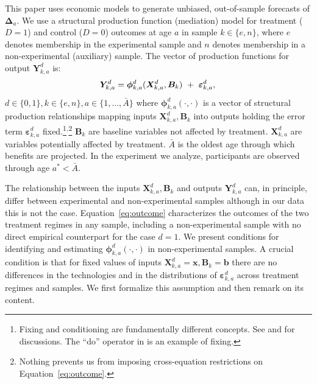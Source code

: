 \noindent This paper uses economic models to generate unbiased, out-of-sample forecasts of $\bm{\Delta}_a$. We use a structural production function (mediation) model for treatment ($D=1$) and control ($D=0$) outcomes at age $a$ in sample $k \in \{e,n\}$, where $e$ denotes membership in the experimental sample and $n$ denotes membership in a non-experimental (auxiliary) sample. The vector of production functions for output $\bm{Y}^d_{k,a}$ is:
\begin{equation}
\bm{Y}^d_{k,a} = \bm{\phi}^d_{k,a} (\bm{X}^d_{k,a}, \bm{B}_k) \ + \ \bm{\varepsilon}^d_{k,a},  \label{eq:outcome} \\
\end{equation}
$d \in\{0,1\},  k\in\{e,n\}, a\in\{1,\dots,\bar{A}\}$ where $\bm{\phi}^d_{k,a}\left( \cdot, \cdot \right)$ is a vector of structural production relationships mapping inputs $\bm{X}^d_{k,a}, \bm{B}_k$ into outputs holding the error term $\bm{\varepsilon}^d_{k,a}$ fixed.\footnote{Fixing and conditioning are fundamentally different concepts. See \cite{Haavelmo_1943_Econometrica} and \citet{Heckman_Pinto_2015_EconometReviews} for discussions. The ``do'' operator in \citet{Pearl_2009_BOOKcausality} is an example of fixing.}$^{\text{,}}$\footnote{Nothing prevents us from imposing cross-equation restrictions on Equation~\eqref{eq:outcome}.} $\bm{B}_k$ are baseline variables not affected by treatment. $\bm{X}^d_{k,a}$ are variables potentially affected by treatment. $\bar{A}$ is the oldest age through which benefits are projected. In the experiment we analyze, participants are observed through age $a^*< \bar{A}$.

The relationship between the inputs $\bm{X}^d_{k,a}, \bm{B}_k$ and outputs $\bm{Y}^d_{k,a}$ can, in principle, differ between experimental and non-experimental samples although in our data this is not the case. Equation~\eqref{eq:outcome} characterizes the outcomes of the two treatment regimes in any sample, including a non-experimental sample with no direct empirical counterpart for the case $d = 1$. We present conditions for identifying and estimating $\bm{\phi}^d_{k,a}\left( \cdot, \cdot \right)$ in non-experimental samples. A crucial condition is that for fixed values of inputs $\bm{X}^d_{k,a} = \bm{x}, \bm{B}_k = \bm{b}$ there are no differences in the technologies and in the distributions of $\bm{\varepsilon}_{k,a}^d$ across treatment regimes and samples. We first formalize this assumption and then remark on its content.

\onehalfspacing

